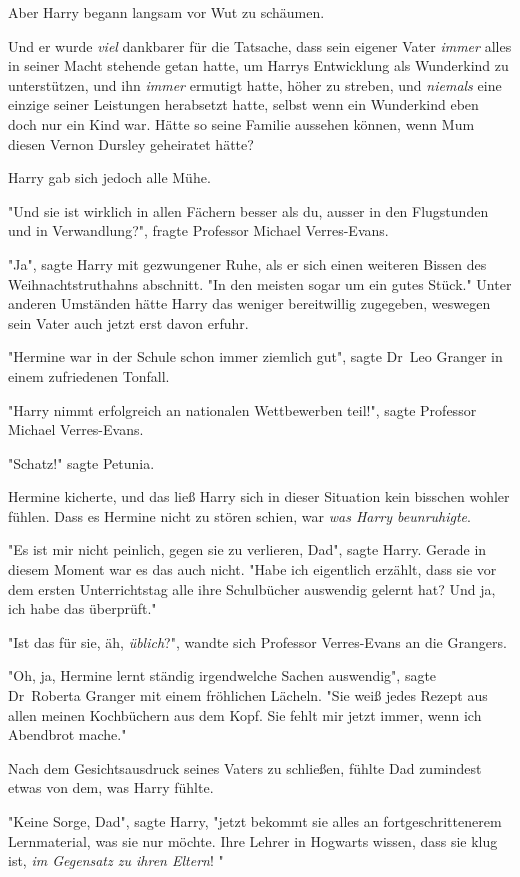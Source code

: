 {Aber Harry begann langsam vor Wut zu schäumen.

Und er wurde \emph{viel} dankbarer für die Tatsache, dass sein eigener Vater \emph{immer} alles in seiner Macht stehende getan hatte, um Harrys Entwicklung als Wunderkind zu unterstützen, und ihn \emph{immer} ermutigt hatte, höher zu streben, und \emph{niemals} eine einzige seiner Leistungen herabsetzt hatte, selbst wenn ein Wunderkind eben doch nur ein Kind war. Hätte so seine Familie aussehen können, wenn Mum diesen Vernon Dursley geheiratet hätte?

Harry gab sich jedoch alle Mühe.

"Und sie ist wirklich in allen Fächern besser als du, ausser in den Flugstunden und in Verwandlung?", fragte Professor Michael Verres-Evans.

"Ja", sagte Harry mit gezwungener Ruhe, als er sich einen weiteren Bissen des Weihnachtstruthahns abschnitt. "In den meisten sogar um ein gutes Stück." Unter anderen Umständen hätte Harry das weniger bereitwillig zugegeben, weswegen sein Vater auch jetzt erst davon erfuhr.

"Hermine war in der Schule schon immer ziemlich gut", sagte Dr~Leo Granger in einem zufriedenen Tonfall.

"Harry nimmt erfolgreich an nationalen Wettbewerben teil!", sagte Professor Michael Verres-Evans.

"Schatz!" sagte Petunia.

Hermine kicherte, und das ließ Harry sich in dieser Situation kein bisschen wohler fühlen. Dass es Hermine nicht zu stören schien, war \emph{was Harry beunruhigte}.

"Es ist mir nicht peinlich, gegen sie zu verlieren, Dad", sagte Harry. Gerade in diesem Moment war es das auch nicht. "Habe ich eigentlich erzählt, dass sie vor dem ersten Unterrichtstag alle ihre Schulbücher auswendig gelernt hat? Und ja, ich habe das überprüft."

"Ist das für sie, äh, \emph{üblich}?", wandte sich Professor Verres-Evans an die Grangers.

"Oh, ja, Hermine lernt ständig irgendwelche Sachen auswendig", sagte Dr~Roberta Granger mit einem fröhlichen Lächeln. "Sie weiß jedes Rezept aus allen meinen Kochbüchern aus dem Kopf. Sie fehlt mir jetzt immer, wenn ich Abendbrot mache."

Nach dem Gesichtsausdruck seines Vaters zu schließen, fühlte Dad zumindest etwas von dem, was Harry fühlte.

"Keine Sorge, Dad", sagte Harry, "jetzt bekommt sie alles an fortgeschrittenerem Lernmaterial, was sie nur möchte. Ihre Lehrer in Hogwarts wissen, dass sie klug ist, \emph{im Gegensatz zu ihren Eltern}! "

}

